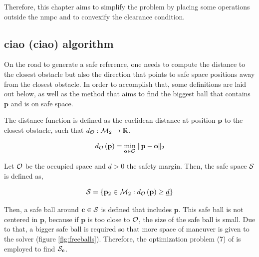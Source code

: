 Therefore, this chapter aims to simplify the problem by placing some operations outside the \acrshort{nmpc} and to convexify the clearance condition.

\subsection{\acrlong{ciao} (\acrshort{ciao}) algorithm}

On the road to generate a safe reference, one needs to compute the distance to the closest obstacle but also the direction that points to safe space positions away from the closest obstacle. In order to accomplish that, some definitions are laid out below, as well as the method that aims to find the biggest ball that contains $\mathbf{p}$ and is on safe space.

\begin{definition}
The distance function is defined as the euclidean distance at position $\mathbf{p}$ to the closest obstacle, such that $d_{\mathcal{O}}:\mathcal{M}_2 \rightarrow \mathbb{R}$.

\begin{equation}
d_\mathcal{\mathcal{O}}\left(\mathbf{p}\right) = \underset{\mathbf{o} \in \mathcal{\mathcal{O}}}{\text{min}}\;\| \mathbf{p} - \mathbf{o} \|_2
\end{equation}
\end{definition}

\begin{definition}
Let $\mathcal{O}$ be the occupied space and $\underline{d} > 0$ the safety margin. Then, the safe space $\mathcal{\mathcal{S}}$ is defined as,

\begin{equation}
\mathcal{\mathcal{S}} = \{\mathbf{p}_2 \in \mathcal{M}_2: d_{\mathcal{O}}\left(\mathbf{p}\right) \geq \underline{d} \}
\end{equation}
\end{definition}

Then, a safe ball around $\mathbf{c} \in \mathcal{S}$ is defined that includes $\mathbf{p}$. This safe ball is not centered in $\mathbf{p}$, because if $\mathbf{p}$ is too close to $\mathcal{O}$, the size of the safe ball is small. Due to that, a bigger safe ball is required so that more space of maneuver is given to the solver (figure \ref{fig:freeballs}). Therefore, the optimization problem (7) of \cite{schoels2020ciao} is employed to find $\mathcal{S}_\mathbf{c}$.


